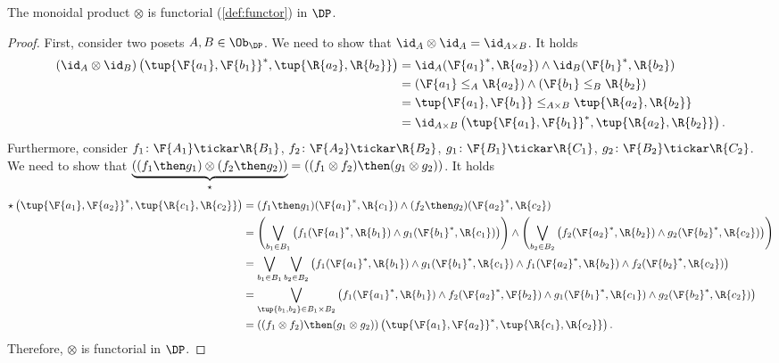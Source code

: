 \begin{lemma}
\label{lemma:monoidal_functorial}
The monoidal product $\otimes$ is functorial (\cref{def:functor}) in $\DP$.
\end{lemma}
\begin{proof}
First, consider two posets $A,B\in \Ob_\DP$. We need to show that $\id_A\otimes \id_A = \id_{A\times B}$. It holds
\begin{equation}
\begin{aligned}
    \left( \id_{A}\otimes \id_{B}\right)
    \left( \tup{\F{a_1},\F{b_1}}^*,\tup{\R{a_2},\R{b_2}}\right)&=
    \id_A(\F{a_1}^*,\R{a_2})\wedge \id_B(\F{b_1}^*,\R{b_2})\\
    &=\left( \F{a_1}\leq_A \R{a_2}\right)\wedge \left( \F{b_1}\leq_B \R{b_2}\right)\\
    &=\tup{\F{a_1},\F{b_1}}\leq_{A\times B}\tup{\R{a_2},\R{b_2}}\\
    &=\id_{A\times B}\left( \tup{\F{a_1},\F{b_1}}^*,\tup{\R{a_2},\R{b_2}}\right).
\end{aligned}
\end{equation}
Furthermore, consider $f_1\colon \F{A_1} \tickar \R{B_1}$, $f_2\colon \F{A_2}\tickar \R{B_2}$, $g_1\colon \F{B_1}\tickar \R{C_1}$, $g_2\colon \F{B_2}\tickar \R{C_2}$. We need to show that $\underbrace{\left( (f_1\then g_1) \otimes (f_2\then g_2)\right)}_{\star}=\left( (f_1\otimes f_2)\then (g_1\otimes g_2)\right)$. It holds
\begin{equation}
\begin{aligned}
    \star \left( \tup{\F{a_1},\F{a_2}}^*,\tup{\R{c_1},\R{c_2}}\right)&=(f_1\then g_1)(\F{a_1}^*,\R{c_1})\wedge (f_2\then g_2)(\F{a_2}^*,\R{c_2})\\
    &=\left(\bigvee_{b_1\in B_1}\left( f_1(\F{a_1}^*,\R{b_1})\wedge g_1(\F{b_1}^*,\R{c_1})\right)\right) \wedge\left(\bigvee_{b_2\in B_2}\left( f_2(\F{a_2}^*,\R{b_2})\wedge g_2(\F{b_2}^*,\R{c_2})\right)\right)\\
    &=\bigvee_{b_1\in B_1}\bigvee_{b_2\in B_2} \left(f_1(\F{a_1}^*,\R{b_1})\wedge g_1(\F{b_1}^*,\R{c_1})\wedge f_1(\F{a_2}^*,\R{b_2})\wedge f_2(\F{b_2}^*,\R{c_2}) \right)\\
    &=\bigvee_{\tup{b_1,b_2}\in B_1\times B_2} \left(f_1(\F{a_1}^*,\R{b_1})\wedge f_2(\F{a_2}^*,\F{b_2})\wedge g_1(\F{b_1}^*,\R{c_1})\wedge g_2(\F{b_2}^*,\R{c_2}) \right)\\
    &=\left( (f_1\otimes f_2)\then (g_1\otimes g_2)\right)\left(\tup{\F{a_1},\F{a_2}}^*,\tup{\R{c_1},\R{c_2}} \right).
\end{aligned}
\end{equation}
Therefore, $\otimes$ is functorial in $\DP$.
\end{proof}


